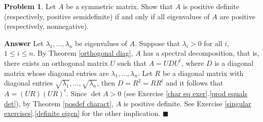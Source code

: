 \documentclass[12pt,letterpaper]{book}
\numberwithin{equation}{section}
\theoremstyle{definition}
\newtheorem{problem}[thm]{\textbf{Problem}}
\newenvironment{answer}{\noindent\textbf{Answer}}{\hfill$\blacksquare$\vspace{0.1in}}
\begin{document}
\begin{problem}\label{pd easy criterion}
Let $A$ be a symmetric matrix. Show that $A$ is positive definite (respectively, positive semidefinite) if and only if all eigenvalues of $A$ are positive (respectively, nonnegative).
\end{problem}

\begin{answer}
Let $\lambda_1,\ldots,\lambda_n$ be eigenvalues of $A$. Suppose that $\lambda_i>0$ for all $i$, $1\leq i \leq n$. By Theorem \ref{orthogonal diag}, $A$ has a spectral decomposition, that is, there exists an orthogonal matrix $U$ such that $A=UDU^t$, where $D$ is a diagonal matrix whose diagonal entries are $\lambda_1,\ldots,\lambda_n$. Let $R$ be a diagonal matrix with diagonal entries $\sqrt{\lambda_1},\ldots,\sqrt{\lambda_n}$, then $D=R^2=RR^t$ and it follows that $A=(UR)(UR)^t$. Since $\det A>0$ (see Exercise \ref{char eq exer}.\ref{prod equals det}), by Theorem \ref{posdef charact}, $A$ is positive definite. See Exercise \ref{singular exercises}.\ref{definite eigen} for the other implication.
\end{answer}
\end{document}
